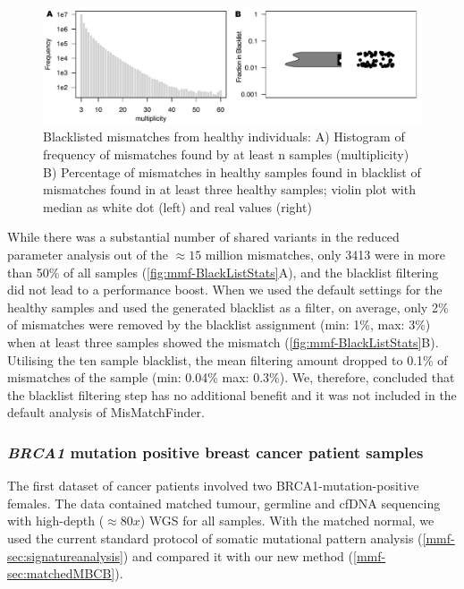\begin{figure}[ht]
\centering
\includegraphics[width=.99\linewidth]{Figures/MisMatchFinder/mmfBlackListStats.pdf}
\caption[Blacklisted mismatches from healthy individuals]{Blacklisted mismatches from healthy individuals: A) Histogram of frequency of mismatches found by at least n samples (multiplicity) B) Percentage of mismatches in healthy samples found in blacklist of mismatches found in at least three healthy samples; violin plot with median as white dot (left) and real values (right)}\label{fig:mmf-BlackListStats}
\end{figure}

While there was a substantial number of shared variants in the reduced parameter analysis out of the $\approx 15$ million mismatches, only 3413 were in more than 50\% of all samples (\autoref{fig:mmf-BlackListStats}A), and the blacklist filtering  did not lead to a performance boost. When we used the default settings for the healthy samples and used the generated blacklist as a filter, on average, only 2\% of mismatches were removed by the blacklist assignment (min: 1\%, max: 3\%) when at least three samples showed the mismatch (\autoref{fig:mmf-BlackListStats}B). Utilising the ten sample blacklist, the mean filtering amount dropped to 0.1\% of mismatches of the sample (min: 0.04\% max: 0.3\%). We, therefore, concluded that the blacklist filtering step has no additional benefit and it was not included in the default analysis of MisMatchFinder. 

\subsubsection{\textit{BRCA1} mutation positive breast cancer patient samples}
\label{mmf-sec:brcapatients}
The first dataset of cancer patients involved two BRCA1-mutation-positive females. The data contained matched tumour, germline and cfDNA sequencing with high-depth ($\approx 80x$) WGS for all samples. With the matched normal, we used the current standard protocol of somatic mutational pattern analysis (\autoref{mmf-sec:signatureanalysis}) and compared it with our new method (\autoref{mmf-sec:matchedMBCB}). 

